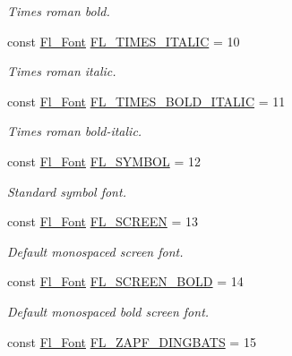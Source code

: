 \begin{DoxyCompactItemize}
\begin{DoxyCompactList}\small\item\em Times roman bold. \end{DoxyCompactList}\item 
const \hyperlink{_enumerations_8_h_a2ac46d9f082834b969fffe490a03a709}{Fl\+\_\+\+Font} \hyperlink{_enumerations_8_h_a881c8b4f190bccdf48d2df42ca921586}{F\+L\+\_\+\+T\+I\+M\+E\+S\+\_\+\+I\+T\+A\+L\+IC} = 10
\begin{DoxyCompactList}\small\item\em Times roman italic. \end{DoxyCompactList}\item 
const \hyperlink{_enumerations_8_h_a2ac46d9f082834b969fffe490a03a709}{Fl\+\_\+\+Font} \hyperlink{_enumerations_8_h_a1315245575ff4617c3dbee5b42649212}{F\+L\+\_\+\+T\+I\+M\+E\+S\+\_\+\+B\+O\+L\+D\+\_\+\+I\+T\+A\+L\+IC} = 11
\begin{DoxyCompactList}\small\item\em Times roman bold-\/italic. \end{DoxyCompactList}\item 
const \hyperlink{_enumerations_8_h_a2ac46d9f082834b969fffe490a03a709}{Fl\+\_\+\+Font} \hyperlink{_enumerations_8_h_a2b2df61e619d3e6658b2fbb5cef5dc8e}{F\+L\+\_\+\+S\+Y\+M\+B\+OL} = 12
\begin{DoxyCompactList}\small\item\em Standard symbol font. \end{DoxyCompactList}\item 
const \hyperlink{_enumerations_8_h_a2ac46d9f082834b969fffe490a03a709}{Fl\+\_\+\+Font} \hyperlink{_enumerations_8_h_a54136abc1d834eea22975288d5393ebe}{F\+L\+\_\+\+S\+C\+R\+E\+EN} = 13
\begin{DoxyCompactList}\small\item\em Default monospaced screen font. \end{DoxyCompactList}\item 
const \hyperlink{_enumerations_8_h_a2ac46d9f082834b969fffe490a03a709}{Fl\+\_\+\+Font} \hyperlink{_enumerations_8_h_abcd5288ae4c97da3a85ee095cafb44e0}{F\+L\+\_\+\+S\+C\+R\+E\+E\+N\+\_\+\+B\+O\+LD} = 14
\begin{DoxyCompactList}\small\item\em Default monospaced bold screen font. \end{DoxyCompactList}\item 
const \hyperlink{_enumerations_8_h_a2ac46d9f082834b969fffe490a03a709}{Fl\+\_\+\+Font} \hyperlink{_enumerations_8_h_a30b0e07f3e71e9942b7e30ebfcc73d37}{F\+L\+\_\+\+Z\+A\+P\+F\+\_\+\+D\+I\+N\+G\+B\+A\+TS} = 15

\end{DoxyCompactItemize}
